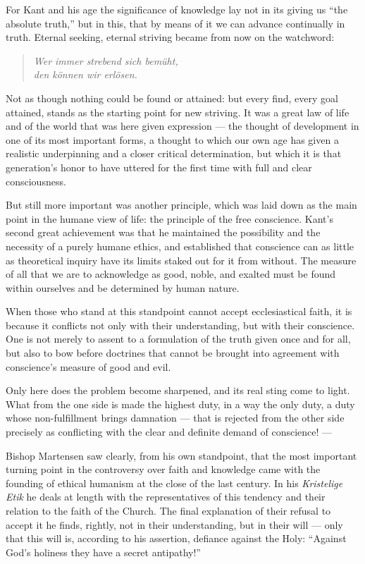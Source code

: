 \documentclass[12pt,a4paper]{article}
\begin{document}
For Kant and his age the significance of knowledge lay not in its giving us
``the absolute truth,'' but in this, that by means of it we can advance
continually in truth. Eternal seeking, eternal striving became from now on the
watchword:

\begin{quote}
\itshape
Wer immer strebend sich bemüht,\\
den können wir erlösen.
\end{quote}

Not as though nothing could be found or attained: but every find, every goal
attained, stands as the starting point for new striving. It was a great law of
life and of the world that was here given expression --- the thought of
development in one of its most important forms, a thought to which our own age
has given a realistic underpinning and a closer critical determination, but
which it is that generation's honor to have uttered for the first time with
full and clear consciousness.

But still more important was another principle, which was laid down as the
main point in the humane view of life: the principle of the free conscience.
Kant's second great achievement was that he maintained the possibility and the
necessity of a purely humane ethics, and established that conscience can as
little as theoretical inquiry have its limits staked out for it from without.
The measure of all that we are to acknowledge as good, noble, and exalted must
be found within ourselves and be determined by human nature.

When those who stand at this standpoint cannot accept ecclesiastical faith, it
is because it conflicts not only with their understanding, but with their
conscience. One is not merely to assent to a formulation of the truth given
once and for all, but also to bow before doctrines that cannot be brought into
agreement with conscience's measure of good and evil.

Only here does the problem become sharpened, and its real sting come to light.
What from the one side is made the highest duty, in a way the only duty, a
duty whose non-fulfillment brings damnation --- that is rejected from the
other side precisely as conflicting with the clear and definite demand of
conscience! ---

Bishop Martensen saw clearly, from his own standpoint, that the most important
turning point in the controversy over faith and knowledge came with the
founding of ethical humanism at the close of the last century. In his
\emph{Kristelige Etik} he deals at length with the representatives of this
tendency and their relation to the faith of the Church. The final explanation
of their refusal to accept it he finds, rightly, not in their understanding,
but in their will --- only that this will is, according to his assertion,
defiance against the Holy: ``Against God's holiness they have a secret
antipathy!''
\end{document}
